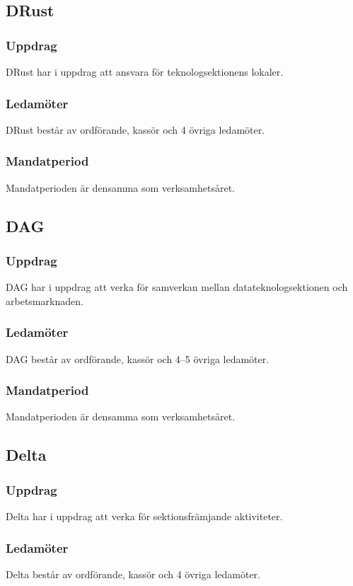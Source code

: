 \subsection{DRust}
\subsubsection{Uppdrag}
DRust har i uppdrag att ansvara för teknologsektionens lokaler.
\subsubsection{Ledamöter}
DRust består av ordförande, kassör och 4 övriga ledamöter.
\subsubsection{Mandatperiod}
Mandatperioden är densamma som verksamhetsåret. 

\subsection{DAG}
\subsubsection{Uppdrag} 
DAG har i uppdrag att verka för samverkan mellan datateknologsektionen och arbetsmarknaden. 
\subsubsection{Ledamöter}
DAG består av ordförande, kassör och 4--5 övriga ledamöter.
\subsubsection{Mandatperiod}
Mandatperioden är densamma som verksamhetsåret.

\subsection{Delta}
\subsubsection{Uppdrag}
Delta har i uppdrag att verka för sektionsfrämjande aktiviteter. 
\subsubsection{Ledamöter}
Delta består av ordförande, kassör och 4 övriga ledamöter.
